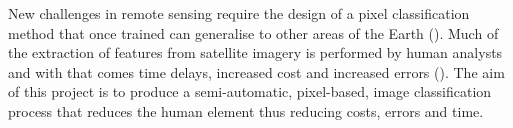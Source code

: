 New challenges in remote sensing require the design of a pixel classification method that once trained can generalise to other areas of the Earth (\cite{maggiori17a}). Much of the extraction of features from satellite imagery is performed by human analysts and with that comes time delays, increased cost and increased errors (\cite{mnih13}). The aim of this project is to produce a semi-automatic, pixel-based, image classification process that reduces the human element thus reducing costs, errors and time.
